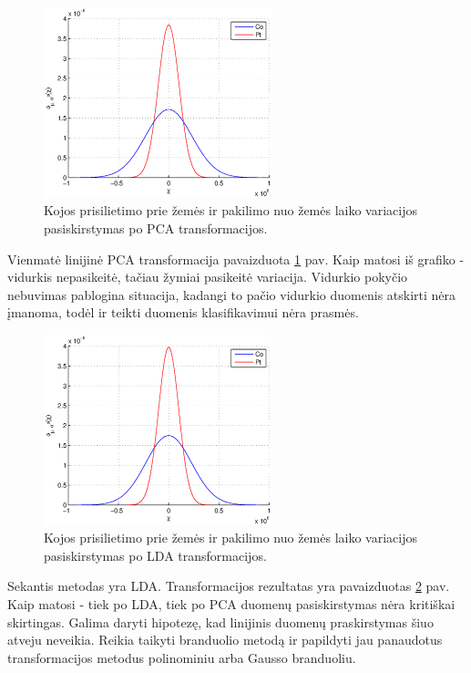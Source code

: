 \documentclass[]{vgtuef}
\begin{document}
\begin{figure}[!t]
  \centering
  \includegraphics[width=250px]{figures/st_sw_linear_kpca.eps}
  \caption{Kojos prisilietimo prie žemės ir pakilimo nuo žemės laiko
    variacijos pasiskirstymas po PCA transformacijos.}
  \label{fig:linear_pca}
\end{figure}

Vienmatė linijinė PCA transformacija pavaizduota
\ref{fig:linear_pca} pav. Kaip matosi iš grafiko - vidurkis nepasikeitė,
tačiau žymiai pasikeitė variacija. Vidurkio pokyčio nebuvimas
pablogina situacija, kadangi to pačio vidurkio duomenis atskirti nėra
įmanoma, todėl ir teikti duomenis klasifikavimui nėra prasmės.

\begin{figure}[!t]
  \centering
  \includegraphics[width=250px]{figures/st_sw_linear_lda.eps}
  \caption{Kojos prisilietimo prie žemės ir pakilimo nuo žemės laiko
    variacijos pasiskirstymas po LDA transformacijos.}
  \label{fig:linear_lda}
\end{figure}

Sekantis metodas yra LDA. Transformacijos rezultatas yra pavaizduotas
\ref{fig:linear_lda} pav. Kaip matosi - tiek po LDA, tiek po PCA
duomenų pasiskirstymas nėra kritiškai skirtingas. Galima daryti
hipotezę, kad linijinis duomenų praskirstymas šiuo atveju
neveikia. Reikia taikyti branduolio metodą ir papildyti jau panaudotus
transformacijos metodus polinominiu arba Gausso branduoliu.
\end{document}
